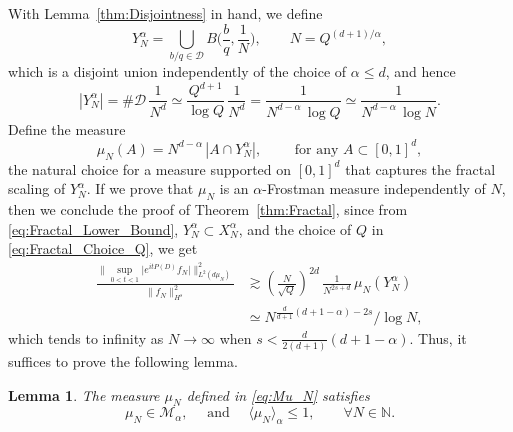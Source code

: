 \documentclass[11pt,reqno]{amsart}
\newtheorem{lem}[thm]{Lemma}
\theoremstyle{definition}
\numberwithin{equation}{section}
\theoremstyle{remark}
\begin{document}
With Lemma~\ref{thm:Disjointness} in hand, we define
\begin{equation}
    Y_N^\alpha = \bigcup_{b/q \in \mathcal D} B\Big( \frac{b}{q}, \frac{1}{N}  \Big), 
    \qquad N = Q^{(d+1)/\alpha}, 
\end{equation}
which is a disjoint union independently of the choice of $\alpha \leq d$, and hence
\begin{equation}
    | Y_N^\alpha | 
    = \#\mathcal D \, \frac{1}{N^d}
    \simeq \frac{Q^{d+1}}{\log Q} \, \frac{1}{N^d}
    = \frac{1}{N^{d-\alpha} \, \log Q}
    \simeq \frac{1}{N^{d-\alpha} \, \log N}.
\end{equation}
Define the measure 
\begin{equation}\label{eq:Mu_N}
    \mu_N(A) 
    = N^{d-\alpha} \, |A \cap Y_N^\alpha|, 
    \qquad \text{ for any } A \subset [0,1]^d,  
\end{equation}
the natural choice for a measure supported on $[0,1]^d$ that captures the fractal scaling of $Y_N^\alpha$.
If we prove that $\mu_N$ is an $\alpha$-Frostman measure independently of $N$, 
then we conclude the proof of Theorem~\ref{thm:Fractal}, 
since from \eqref{eq:Fractal_Lower_Bound}, 
$Y_N^\alpha \subset X_N^\alpha$, 
and the choice of $Q$ in \eqref{eq:Fractal_Choice_Q}, 
we get
\begin{equation}
\begin{split}
    \frac{\Big\lVert \sup_{0<t<1} \big| e^{itP(D)}f_N \big| \Big\rVert_{L^2(d\mu_N)}^2}{\lVert f_N  \rVert_{H^s}^2}
    & \gtrsim \left( \frac{N}{\sqrt{Q}} \right)^{2d} \, \frac{1}{N^{2s + d}} \, \mu_N(Y_N^\alpha) \\
    & \simeq  N^{\frac{d}{d+1}(d + 1 -\alpha) - 2s} / \log N,
    \end{split}
\end{equation}
which tends to infinity as $N \to \infty$ when $s < \frac{d}{2(d+1)}(d+1-\alpha)$. 
Thus, it suffices to prove the following lemma. 
\begin{lem}
    The measure $\mu_N$ defined in \eqref{eq:Mu_N} satisfies 
    \begin{equation}
        \mu_N \in \mathcal M_\alpha, \quad \text{ and } \quad 
        \langle \mu_N \rangle_\alpha \leq 1, \qquad \forall N \in \mathbb N. 
    \end{equation}
\end{lem}
\end{document}
